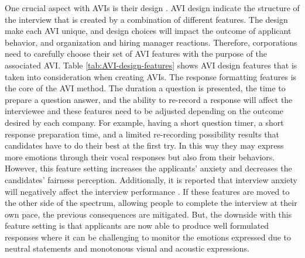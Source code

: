 One crucial aspect with AVIs is their design \cite{video-interview1-LUKACIK2022100789}. AVI design indicate the structure of the interview that is created by a combination of different features. The design make each AVI unique, and design choices will impact the outcome of applicant behavior, and organization and hiring manager reactions. Therefore, corporations need to carefully choose their set of AVI features with the purpose of the associated AVI. Table \ref{tab:AVI-design-features} shows AVI design features that is taken into consideration when creating AVIs. The response formatting features is the core of the AVI method. The duration a question is presented, the time to prepare a question answer, and the ability to re-record a response will affect the interviewee and these features need to be adjusted depending on the outcome desired by each company. For example, having a short question timer, a short response preparation time, and a limited re-recording possibility results that candidates have to do their best at the first try. In this way they may express more emotions through their vocal responses but also from their behaviors. However, this feature setting increases the applicants' anxiety and decreases the candidates' fairness perception. Additionally, it is reported that interview anxiety will negatively affect the interview performance \cite{interview_anxiety1_powell2018meta} \cite{interview_nerves1_fletcher1990relationships}. If these features are moved to the other side of the spectrum, allowing people to complete the interview at their own pace, the previous consequences are mitigated. But, the downside with this feature setting is that applicants are now able to produce well formulated responses where it can be challenging to monitor the emotions expressed due to neutral statements and monotonous visual and acoustic expressions. \\ 

